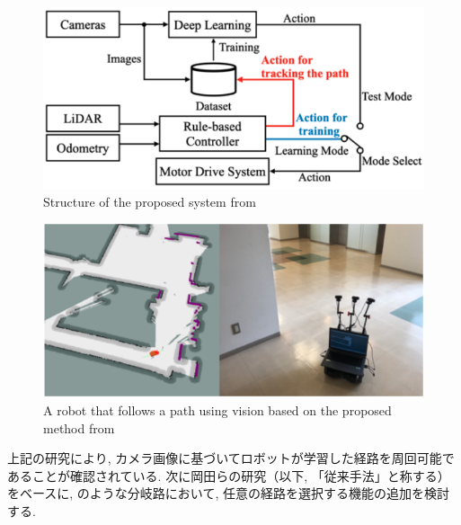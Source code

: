 \vspace{2.5cm}

\begin{figure}[hbtp]
     \centering
     \includegraphics[keepaspectratio, scale=0.55]
          {images/okada_structure.png}
     \caption{Structure of the proposed system from \cite{okada1}}
     \label{Fig:okada_structure}
\end{figure}

\begin{figure}[hbtp]
     \centering
    \includegraphics[keepaspectratio, scale=0.5]
         {images/okada_nav.png}
    \caption{A robot that follows a path using vision based on the proposed method from \cite{okada1}}
    \label{Fig:okada_nav}
\end{figure}

\newpage

上記の研究により, カメラ画像に基づいてロボットが学習した経路を周回可能であることが確認されている. 次に岡田らの研究（以下, 「従来手法」と称する）をベースに, のような分岐路において, 任意の経路を選択する機能の追加を検討する.

\vspace{1cm}

